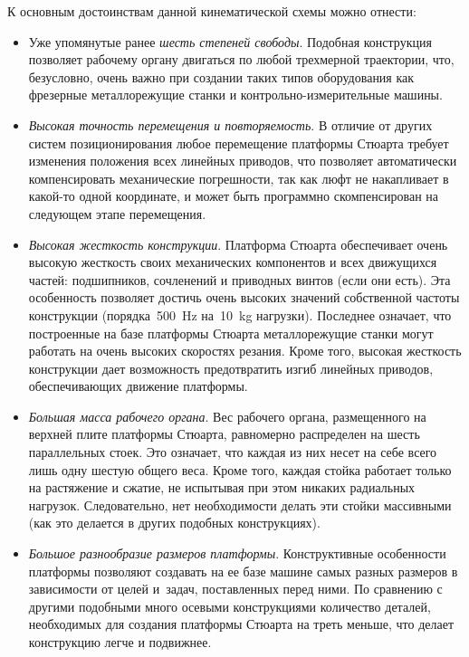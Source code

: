 К основным достоинствам данной кинематической схемы можно отнести:
\begin{itemize}
	\item Уже упомянутые ранее \textit{шесть степеней свободы}. Подобная конструкция позволяет рабочему органу двигаться по любой трехмерной траектории, что, безусловно, очень важно при создании таких типов оборудования как фрезерные металлорежущие станки и контрольно-измерительные машины.
	
	\item \textit{Высокая точность перемещения и повторяемость}. В отличие от других систем позиционирования любое перемещение платформы Стюарта требует изменения положения всех линейных приводов, что позволяет автоматически компенсировать механические погрешности, так как люфт не накапливает в какой-то одной координате, и может быть программно скомпенсирован на следующем этапе перемещения.
	
	\item \textit{Высокая жесткость конструкции}. Платформа Стюарта обеспечивает очень высокую жесткость своих механических компонентов и всех движущихся частей: подшипников, сочленений и приводных винтов (если они есть). Эта особенность позволяет достичь очень высоких значений собственной частоты конструкции (порядка~\SI{500}{\hertz} на~\SI{10}{\kilogram} нагрузки). Последнее означает, что построенные на базе платформы Стюарта металлорежущие станки могут работать на очень высоких скоростях резания. Кроме того, высокая жесткость конструкции дает возможность предотвратить изгиб линейных приводов, обеспечивающих движение платформы.
	
	\item \textit{Большая масса рабочего органа}. Вес рабочего органа, размещенного на верхней плите платформы Стюарта, равномерно распределен на шесть параллельных стоек. Это означает, что каждая из них несет на себе всего лишь одну шестую общего веса. Кроме того, каждая стойка работает только на растяжение и сжатие, не испытывая при этом никаких радиальных нагрузок. Следовательно, нет необходимости делать эти стойки массивными (как это делается в других подобных конструкциях).
	
	\item \textit{Большое разнообразие размеров платформы}. Конструктивные особенности платформы позволяют создавать на ее базе машине самых разных размеров в зависимости от целей и~задач, поставленных перед ними. По сравнению с другими подобными много осевыми конструкциями количество деталей, необходимых для создания платформы Стюарта на треть меньше, что делает конструкцию легче и подвижнее.
\end{itemize}
